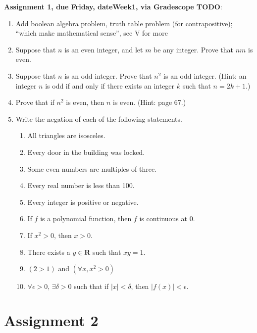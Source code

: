 \documentclass[12pt]{article}
\begin{document}
\noindent \textbf{Assignment 1, due Friday, \csname dateWeek1\endcsname, via Gradescope TODO}:
\begin{enumerate}
\item Add boolean algebra problem, truth table problem (for contrapositive); ``which make mathematical sense'', see V for more
\item Suppose that $n$ is an even integer, and let $m$ be any integer. Prove that $nm$ is even. 
\item Suppose that $n$ is an odd integer. Prove that $n^2$ is an odd integer. (Hint: an integer $n$ is odd if and only if there exists an integer $k$ such that $n = 2k+1$.)
\item Prove that if $n^2$ is even, then $n$ is even. (Hint: page 67.)
\item Write the negation of each of the following statements.

 \begin{enumerate}
\item All triangles are isosceles.
\item Every door in the building was locked.
\item Some even numbers are multiples of three.
\item Every real number is less than 100.
\item Every integer is positive or negative.
\item If $f$ is a polynomial function, then $f$ is continuous at $0$.
\item If $x^2 > 0$, then $x > 0$.
\item There exists a $y \in \mathbf{R}$ such that $xy = 1$.
\item $(2 > 1)$ and $(\forall x, x^2 > 0)$
\item $\forall \epsilon > 0$, $\exists \delta > 0$ such that if $|x| < \delta$, then $|f(x)| < \epsilon$.
\end{enumerate}
\end{enumerate}

\newpage
\section[2 (due \csname dateWeek2\endcsname): ``Direct'' proofs and divisibility problems.]{Assignment 2}
\end{document}
